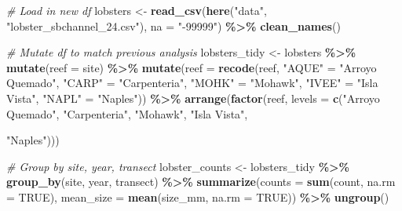 \documentclass[
]{article}
\newenvironment{Shaded}{\begin{snugshade}}{\end{snugshade}}
\newcommand{\AttributeTok}[1]{\textcolor[rgb]{0.13,0.29,0.53}{#1}}
\newcommand{\CommentTok}[1]{\textcolor[rgb]{0.56,0.35,0.01}{\textit{#1}}}
\newcommand{\ConstantTok}[1]{\textcolor[rgb]{0.56,0.35,0.01}{#1}}
\newcommand{\FunctionTok}[1]{\textcolor[rgb]{0.13,0.29,0.53}{\textbf{#1}}}
\newcommand{\NormalTok}[1]{#1}
\newcommand{\OtherTok}[1]{\textcolor[rgb]{0.56,0.35,0.01}{#1}}
\newcommand{\SpecialCharTok}[1]{\textcolor[rgb]{0.81,0.36,0.00}{\textbf{#1}}}
\newcommand{\StringTok}[1]{\textcolor[rgb]{0.31,0.60,0.02}{#1}}
\begin{document}
\begin{Shaded}
\begin{Highlighting}[]
\CommentTok{\# Load in new df}
\NormalTok{lobsters }\OtherTok{\textless{}{-}} \FunctionTok{read\_csv}\NormalTok{(}\FunctionTok{here}\NormalTok{(}\StringTok{"data"}\NormalTok{, }\StringTok{"lobster\_sbchannel\_24.csv"}\NormalTok{), }\AttributeTok{na =} \StringTok{"{-}99999"}\NormalTok{) }\SpecialCharTok{\%\textgreater{}\%} 
    \FunctionTok{clean\_names}\NormalTok{()}

\CommentTok{\# Mutate df to match previous analysis }
\NormalTok{lobsters\_tidy }\OtherTok{\textless{}{-}}\NormalTok{ lobsters }\SpecialCharTok{\%\textgreater{}\%} 
    \FunctionTok{mutate}\NormalTok{(}\AttributeTok{reef =}\NormalTok{ site) }\SpecialCharTok{\%\textgreater{}\%} 
    \FunctionTok{mutate}\NormalTok{(}\AttributeTok{reef =} \FunctionTok{recode}\NormalTok{(reef, }
                         \StringTok{"AQUE"} \OtherTok{=} \StringTok{"Arroyo Quemado"}\NormalTok{,}
                         \StringTok{"CARP"} \OtherTok{=} \StringTok{"Carpenteria"}\NormalTok{,}
                         \StringTok{"MOHK"} \OtherTok{=} \StringTok{"Mohawk"}\NormalTok{,}
                         \StringTok{"IVEE"} \OtherTok{=} \StringTok{"Isla Vista"}\NormalTok{,}
                         \StringTok{"NAPL"} \OtherTok{=} \StringTok{"Naples"}\NormalTok{)) }\SpecialCharTok{\%\textgreater{}\%} 
    \FunctionTok{arrange}\NormalTok{(}\FunctionTok{factor}\NormalTok{(reef, }
                   \AttributeTok{levels =} \FunctionTok{c}\NormalTok{(}\StringTok{"Arroyo Quemado"}\NormalTok{, }
                             \StringTok{"Carpenteria"}\NormalTok{, }
                             \StringTok{"Mohawk"}\NormalTok{,}
                             \StringTok{"Isla Vista"}\NormalTok{,}
                  
           \StringTok{"Naples"}\NormalTok{)))}


\CommentTok{\# Group by site, year, transect}
\NormalTok{lobster\_counts }\OtherTok{\textless{}{-}}\NormalTok{ lobsters\_tidy }\SpecialCharTok{\%\textgreater{}\%} 
    \FunctionTok{group\_by}\NormalTok{(site, year, transect) }\SpecialCharTok{\%\textgreater{}\%} 
    \FunctionTok{summarize}\NormalTok{(}\AttributeTok{counts =} \FunctionTok{sum}\NormalTok{(count, }\AttributeTok{na.rm =} \ConstantTok{TRUE}\NormalTok{),}
              \AttributeTok{mean\_size =} \FunctionTok{mean}\NormalTok{(size\_mm, }\AttributeTok{na.rm =} \ConstantTok{TRUE}\NormalTok{)) }\SpecialCharTok{\%\textgreater{}\%} 
    \FunctionTok{ungroup}\NormalTok{()}



\end{Highlighting}
\end{Shaded}
\end{document}
